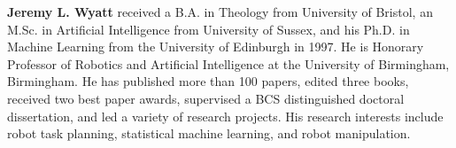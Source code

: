 \documentclass{ws-ijhr}
\begin{document}
\vspace*{13pt}  
\noindent%
\parbox{5truein}{
\begin{minipage}[b]{1truein}
\centerline{{}}
\end{minipage}
\hfill %
\begin{minipage}[b]{3.85truein}
{{\bf Jeremy L. Wyatt}
received a B.A. in Theology from University of Bristol, an M.Sc. in Artificial Intelligence from University of Sussex, and his Ph.D. in Machine Learning from the University of Edinburgh in 1997. He is Honorary Professor of Robotics and Artificial Intelligence at the University of Birmingham, Birmingham. He has published more than 100 papers, edited three books, received two best paper awards, supervised a BCS distinguished doctoral dissertation, and led a variety of research projects. His research interests include robot task planning, statistical machine learning, and robot manipulation. \hfilneg}
\end{minipage}} %


\vfill\eject
\end{document}
